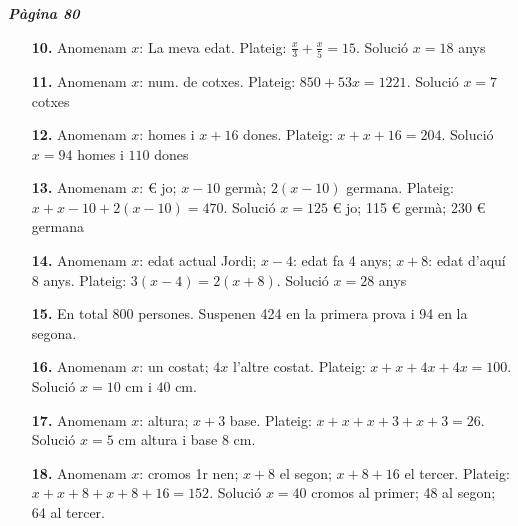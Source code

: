 \documentclass[a4paper, pdf, twoside]{book}
\begin{document}
\begin{multicols}{2}
{\textbf{\em Pàgina 80}} \hrulefill
\begin{enumerate}
\vspace{0.25cm}
\item[\fontfamily{phv}\selectfont\color{blue}\textbf{10. }] 
Anomenam $x$: La meva edat. Plateig: $\frac {x}{3}+\frac {x}{5}=15$. Solució $x=18$ anys
 \end{enumerate}
\begin{enumerate}
\vspace{0.25cm}
\item[\fontfamily{phv}\selectfont\color{blue}\textbf{11. }] 
Anomenam $x$: num. de cotxes. Plateig: $850+53x=1221$. Solució $x=7$ cotxes
\vspace{0.25cm}
\item[\fontfamily{phv}\selectfont\color{blue}\textbf{12. }] 
Anomenam $x$: homes i $x+16$ dones. Plateig: $x+x+16=204$. Solució $x=94$ homes i $110$ dones
\vspace{0.25cm}
\item[\fontfamily{phv}\selectfont\color{blue}\textbf{13. }] 
Anomenam $x$: \euro {} jo; $x-10$ germà; $2(x-10)$ germana. Plateig: $x+x-10+2(x-10)=470$. Solució $x=125$ \euro {} jo; 115 \euro {} germà; 230 \euro {} germana 
\vspace{0.25cm}
\item[\fontfamily{phv}\selectfont\color{blue}\textbf{14. }] 
Anomenam $x$: edat actual Jordi; $x-4$: edat fa 4 anys; $x+8$: edat d'aquí 8 anys. Plateig: $3(x-4)=2(x+8)$. Solució $x=28$ anys
\vspace{0.25cm}
\item[\fontfamily{phv}\selectfont\color{blue}\textbf{15. }]  \scalebox{0.6}{\simbolclau } 
En total 800 persones. Suspenen 424 en la primera prova i 94 en la segona.
\vspace{0.25cm}
\item[\fontfamily{phv}\selectfont\color{blue}\textbf{16. }] 
Anomenam $x$: un costat; $4x$ l'altre costat. Plateig: $x+x+4x+4x=100$. Solució $x=10$ cm i $40$ cm.
\vspace{0.25cm}
\item[\fontfamily{phv}\selectfont\color{blue}\textbf{17. }] 
Anomenam $x$: altura; $x+3$ base. Plateig: $x+x+x+3+x+3=26$. Solució $x=5$ cm altura i base 8 cm.
\vspace{0.25cm}
\item[\fontfamily{phv}\selectfont\color{blue}\textbf{18. }] 
Anomenam $x$: cromos 1r nen; $x+8$ el segon; $x+8+16$ el tercer. Plateig: $x+x+8+x+8+16=152$. Solució $x=40$ cromos al primer; 48 al segon; 64 al tercer.

\end{enumerate}
\end{multicols}
\end{document}
